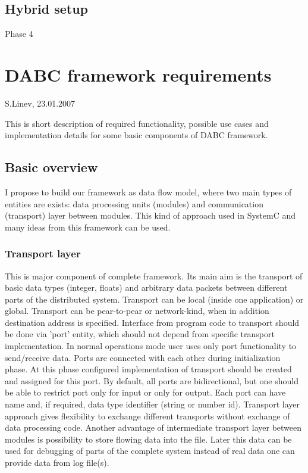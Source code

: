 \subsection{Hybrid setup}
Phase 4
\section{DABC framework requirements}

S.Linev, 23.01.2007

This is short description of required functionality, possible use cases and implementation details for some basic components of DABC framework.

\subsection{Basic overview}
I propose to build our framework as data flow model, where two main types of entities are exists: data processing units (modules) and communication (transport) layer between modules. This kind of approach used in SystemC and many ideas from this framework can be used.

\subsubsection{Transport layer}
This is major component of complete framework. Its main aim is the transport of basic data types (integer, floats) and arbitrary data packets between different parts of the distributed system. Transport can be local (inside one application) or global. Transport can be pear-to-pear or network-kind, when in addition destination address is specified. 
Interface from program code to transport should be done via 'port' entity, which should not depend from specific transport implementation. In normal operations mode user uses only port functionality to send/receive data. 
Ports are connected with each other during initialization phase. At this phase configured implementation of transport should be created and assigned for this port. 
By default, all ports are bidirectional, but one should be able to restrict port only for input or only for output. Each port can have name and, if required, data type identifier (string or number id). 
Transport layer approach gives flexibility to exchange different transports without exchange of data processing code.
Another advantage of intermediate transport layer between modules is possibility to store flowing data into the file. Later this data can be used for debugging of parts of the complete system instead of real data one can provide data from log file(s). 

